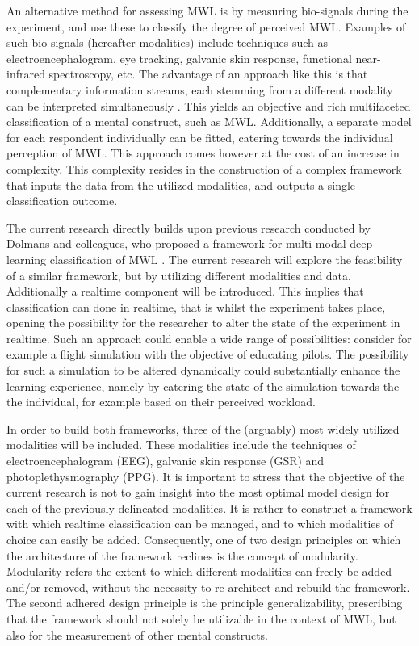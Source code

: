 \documentclass[12pt]{article}
\begin{document}
An alternative method for assessing MWL is by measuring bio-signals during the experiment, and use these to classify the degree of perceived MWL. Examples of such bio-signals (hereafter modalities) include techniques such as electroencephalogram, eye tracking, galvanic skin response, functional near-infrared spectroscopy, etc. The advantage of an approach like this is that complementary information streams, each stemming from a different modality can be interpreted simultaneously \cite{ramachandram2017deep}. This yields an objective and rich multifaceted classification of a mental construct, such as MWL. Additionally, a separate model for each respondent individually can be fitted, catering towards the individual perception of MWL. This approach comes however at the cost of an increase in complexity. This complexity resides in the construction of a complex framework that inputs the data from the utilized modalities, and outputs a single classification outcome. 

The current research directly builds upon previous research conducted by Dolmans and colleagues, who proposed a framework for multi-modal deep-learning classification of MWL \cite{dolmans2020perceived}. The current research will explore the feasibility of a similar framework, but by utilizing different modalities and data. Additionally a realtime component will be introduced. This implies that classification can done in realtime, that is whilst the experiment takes place, opening the possibility for the researcher to alter the state of the experiment in realtime. Such an approach could enable a wide range of possibilities: consider for example a flight simulation with the objective of educating pilots. The possibility for such a simulation to be altered dynamically could substantially enhance the learning-experience, namely by catering the state of the simulation towards the the individual, for example based on their perceived workload. 

In order to build both frameworks, three of the (arguably) most widely utilized modalities will be included. These modalities include the techniques of electroencephalogram (EEG), galvanic skin response (GSR) and photoplethysmography (PPG). It is important to stress that the objective of the current research is not to gain insight into the most optimal model design for each of the previously delineated modalities. It is rather to construct a framework with which realtime classification can be managed, and to which modalities of choice can easily be added. Consequently, one of two design principles on which the architecture of the framework reclines is the concept of modularity. Modularity refers the extent to which different modalities can freely be added and/or removed, without the necessity to re-architect and rebuild the framework. The second adhered design principle is the principle generalizability, prescribing that the framework should not solely be utilizable in the context of MWL, but also for the measurement of other mental constructs.
\end{document}
